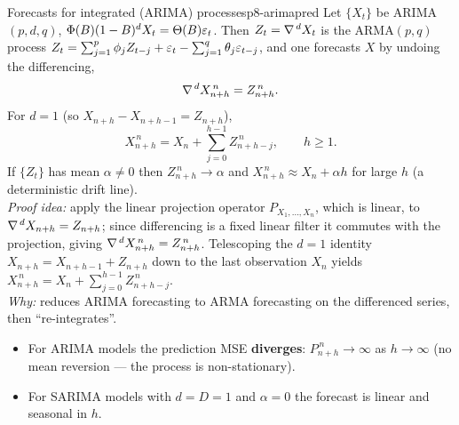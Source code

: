 \begin{proposition}{Forecasts for integrated (ARIMA) processes}{p8-arimapred}
Let $\{X_t\}$ be ARIMA$(p,d,q)$, $\Phi(B)(1-B)^dX_t=\Theta(B)\varepsilon_t$. Then
$Z_t=\nabla^{\,d}X_t$ is the ARMA$(p,q)$ process
$Z_t=\sum_{j=1}^p\phi_jZ_{t-j}+\varepsilon_t-\sum_{j=1}^q\theta_j\varepsilon_{t-j}$, and one
forecasts $X$ by undoing the differencing,
\[
\nabla^{\,d}X^{\,n}_{n+h}=Z^{\,n}_{n+h}.
\]
For $d=1$ (so $X_{n+h}-X_{n+h-1}=Z_{n+h}$),
\[
X^{\,n}_{n+h}=X_n+\sum_{j=0}^{h-1}Z^{\,n}_{n+h-j},\qquad h\ge1 .
\]
If $\{Z_t\}$ has mean $\alpha\ne0$ then $Z^{\,n}_{n+h}\to\alpha$ and
$X^{\,n}_{n+h}\approx X_n+\alpha h$ for large $h$ (a deterministic drift line).\\[2pt]
\textit{Proof idea:} apply the linear projection operator $P_{X_1,\dots,X_n}$,
which is linear, to $\nabla^{\,d}X_{n+h}=Z_{n+h}$; since differencing is a fixed
linear filter it commutes with the projection, giving
$\nabla^{\,d}X^{\,n}_{n+h}=Z^{\,n}_{n+h}$. Telescoping the $d=1$ identity
$X_{n+h}=X_{n+h-1}+Z_{n+h}$ down to the last observation $X_n$ yields
$X^{\,n}_{n+h}=X_n+\sum_{j=0}^{h-1}Z^{\,n}_{n+h-j}$.\\[2pt]
\textit{Why:} reduces ARIMA forecasting to ARMA forecasting on the differenced
series, then ``re-integrates''.
\begin{itemize}
  \item For ARIMA models the prediction MSE \textbf{diverges}:
        $P^{\,n}_{n+h}\to\infty$ as $h\to\infty$ (no mean reversion --- the
        process is non-stationary).
  \item For SARIMA models with $d=D=1$ and $\alpha=0$ the forecast is linear and
        seasonal in $h$.
\end{itemize}
\end{proposition}

